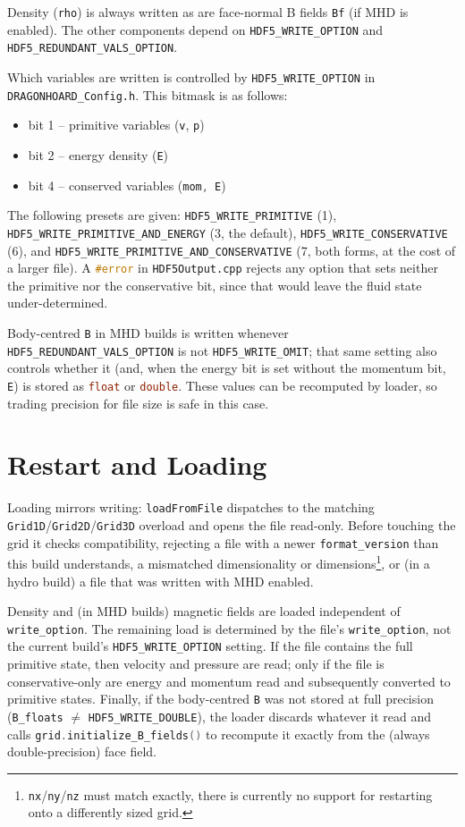 \documentclass[11pt]{report}
\newcommand{\cpp}[1]{\lstinline[language=C++]{#1}}
\newcommand{\bash}[1]{\lstinline[language=bash]{#1}}
\begin{document}
Density (\cpp{rho}) is always written as are face-normal B fields \cpp{Bf} (if MHD is enabled).
The other components depend on \cpp{HDF5_WRITE_OPTION} and \cpp{HDF5_REDUNDANT_VALS_OPTION}.

Which variables are written is controlled by \cpp{HDF5_WRITE_OPTION} in \bash{DRAGONHOARD_Config.h}. This bitmask is as follows:
\begin{itemize}
\item bit 1 -- primitive variables (\cpp{v}, \cpp{p})
\item bit 2 -- energy density (\cpp{E})
\item bit 4 -- conserved variables (\cpp{mom, E})
\end{itemize}
The following presets are given: \cpp{HDF5_WRITE_PRIMITIVE} (1), \cpp{HDF5_WRITE_PRIMITIVE_AND_ENERGY} (3, the default), \cpp{HDF5_WRITE_CONSERVATIVE} (6), and \cpp{HDF5_WRITE_PRIMITIVE_AND_CONSERVATIVE} (7, both forms, at the cost of a larger file). A \cpp{#error} in \bash{HDF5Output.cpp} rejects any option that sets neither the primitive nor the conservative bit, since that would leave the fluid state under-determined. 

Body-centred \cpp{B} in MHD builds is written whenever \cpp{HDF5_REDUNDANT_VALS_OPTION} is not \cpp{HDF5_WRITE_OMIT}; that same setting also controls whether it (and, when the energy bit is set without the momentum bit, \cpp{E}) is stored as \cpp{float} or \cpp{double}. These values can be recomputed by loader, so trading precision for file size is safe in this case.



\section{Restart and Loading}
\label{sec:hoard-restart}

Loading mirrors writing: \cpp{loadFromFile} dispatches to the matching \cpp{Grid1D}/\cpp{Grid2D}/\cpp{Grid3D} overload and opens the file read-only. Before touching the grid it checks compatibility, rejecting a file with a newer \cpp{format_version} than this build understands, a mismatched dimensionality or dimensions\footnote{\cpp{nx}/\cpp{ny}/\cpp{nz}  must match exactly, there is currently no support for restarting onto a differently sized grid.}, or (in a hydro build) a file that was written with MHD enabled. 

Density and (in MHD builds) magnetic fields are loaded independent of \cpp{write_option}. The remaining load is determined by the file's \cpp{write_option}, not the current build's \cpp{HDF5_WRITE_OPTION} setting. If the file contains the full primitive state, then velocity and pressure are read; only if the file is conservative-only are energy and momentum read and subsequently converted to primitive states. Finally, if the body-centred \cpp{B} was not stored at full precision (\cpp{B_floats} $\neq$ \cpp{HDF5_WRITE_DOUBLE}), the loader discards whatever it read and calls \cpp{grid.initialize_B_fields()} to recompute it exactly from the (always double-precision) face field.
\end{document}
